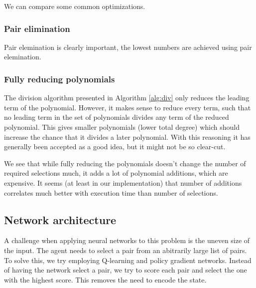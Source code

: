 \documentclass{article}
\theoremstyle{changedot}
\theoremstyle{changedotbreak}
\theoremstyle{nonumberplain}
\begin{document}
We can compare some common optimizations.

\subsubsection{Pair elimination}
Pair elemination is clearly important, the lowest numbers are achieved using pair elemination.



\subsubsection{Fully reducing polynomials}
The division algorithm presented in Algorithm \ref{alg:div} only reduces the leading term of the polynomial. However, it makes sense to reduce every term, such that no leading term in the set of polynomials divides any term of the reduced polynomial. This gives smaller polynomials (lower total degree) which should increase the chance that it divides a later polynomial. With this reasoning it has generally been accepted as a good idea, but it might not be so clear-cut.

We see that while fully reducing the polynomials doesn't change the number of required selections much, it adds a lot of polynomial additions, which are expensive. It seems (at least in our implementation) that number of additions correlates much better with execution time than number of selections. 




\subsection{Network architecture}
A challenge when applying neural networks to this problem is the uneven size of the input. The agent needs to select a pair from an abitrarily large list of pairs. To solve this, we try employing Q-learning and policy gradient networks. Instead of having the network select a pair, we try to score each pair and select the one with the highest score. This removes the need to encode the state.
\end{document}
